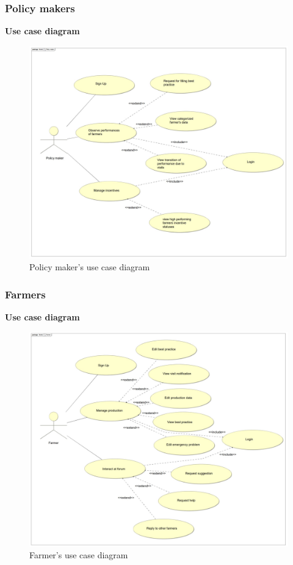 \subsubsection{Policy makers}
\textbf{\textcolor{myblue}{Use case diagram}}
\begin{figure}[H]
	\centering
    \includegraphics[page=1, width=\textwidth]{Images/ud_policy.JPG}
	\caption{\label{fig:pm_use_case_diagram}Policy maker's use case diagram}
\end{figure}
\label{sect:policy_maker_requirements}



\subsubsection{Farmers}
\textbf{\textcolor{myblue}{Use case diagram}}
\begin{figure}[H]
	\centering
    \includegraphics[page=1, width=\textwidth]{Images/ud_fa.JPG}
	\caption{\label{fig:f_use_case_diagram}Farmer's use case diagram}
\end{figure}
\label{sect:farmer_requirements}


